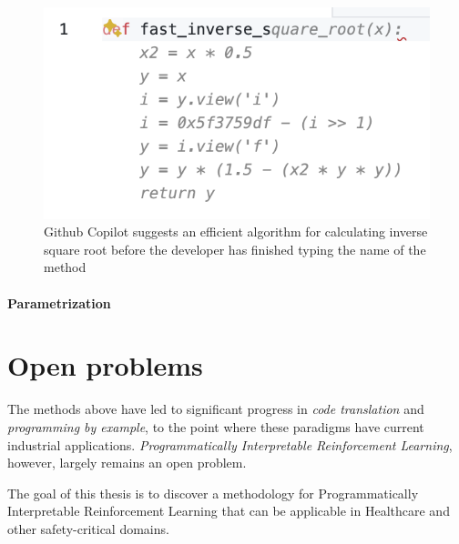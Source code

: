\begin{figure}[H]
    \centering
    \includegraphics{images/fastinversesqrt.png}
    \caption{Github Copilot \cite{dakhelGithubCopilotAi2023, nguyenEmpiricalEvaluationGitHub2022, wermelingerUsingGithubCopilot2023} suggests an efficient algorithm for calculating inverse square root \cite{lomontFastInverseSquare2003} before the developer has finished typing the name of the method}
    \label{fig:fastinversesqrt}
\end{figure}

\paragraph{Parametrization}



\newpage
\section{Open problems}

The methods above have led to significant progress in \emph{code translation} and \emph{programming by example}, to the point where these paradigms have current industrial applications.
\emph{Programmatically Interpretable Reinforcement Learning}, however, largely remains an open problem.

\begin{highlight}
The goal of this thesis is to discover a methodology for Programmatically Interpretable Reinforcement Learning that can be applicable in Healthcare and other safety-critical domains.
\end{highlight}

